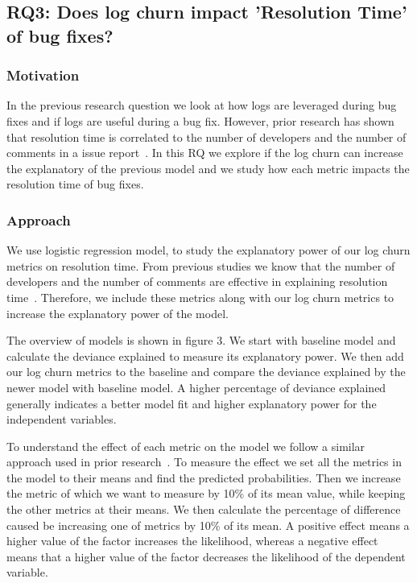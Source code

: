 \subsection*{\textbf{RQ3: Does log churn impact 'Resolution Time' of bug fixes? }}


\subsubsection*{\textbf{Motivation}}

In the previous research question we look at how logs are leveraged during bug fixes and if logs are useful during a bug fix. However, prior research has shown that resolution time is correlated to the number of developers and the number of comments in a issue report~\cite{RTpredictions}. In this RQ we explore if the log churn can increase the explanatory of the previous model and we study how each metric impacts the resolution time of bug fixes.

\subsubsection*{\textbf{Approach}}

We use logistic regression model, to study the explanatory power of our log churn metrics on resolution time. From previous studies we know that the number of developers and the number of  comments are effective in explaining resolution time~\cite {RTpredictions}. Therefore, we include these metrics along with our log churn metrics to increase the explanatory power of the model.

The overview of models is shown in figure 3. We start with baseline model and calculate the deviance explained to measure its explanatory power. We then add our log churn metrics to the baseline and compare the deviance explained by the newer model with baseline model. A higher percentage of deviance explained generally indicates a better model fit and higher explanatory power for the independent variables.


To understand the effect of each metric on the model we follow a similar approach used in prior research~\cite{shihab,mocku}. To measure the effect we set all the metrics in the model to their means and find the predicted probabilities. Then we increase the metric of which we want to measure by 10\% of its mean value, while keeping the other metrics at their means. We then calculate the percentage of difference caused be increasing one of metrics by 10\% of its mean. A positive effect means a higher value of the factor increases the likelihood, whereas a negative effect means that a higher value of the factor decreases the likelihood of the dependent variable.

